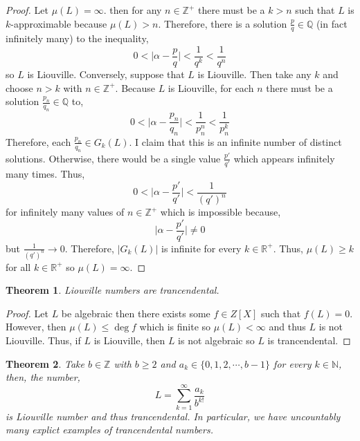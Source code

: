 \documentclass{article}
\newcommand{\Z}{\mathbb{Z}}
\newcommand{\N}{\mathbb{N}}
\newcommand{\Zplus}{\mathbb{Z}^{+}}
\newcommand{\Q}{\mathbb{Q}}
\newcommand{\Rplus}{\mathbb{R}^+}
\theoremstyle{theorem}
\newtheorem{theorem}{Theorem}[section]
\theoremstyle{definition}
\theoremstyle{definition}
\theoremstyle{remark}
\theoremstyle{definition}
\theoremstyle{remark}
\begin{document}
\begin{proof}
Let $\mu(L) = \infty$. then for any $n \in \Zplus$ there must be a $k > n$ such that $L$ is $k$-approximable because $\mu(L) > n$. Therefore, there is a solution $\frac{p}{q} \in \Q$ (in fact infinitely many) to the inequality,
\[0 < \Big| \alpha - \frac{p}{q} \Big| < \frac{1}{q^k} < \frac{1}{q^n}\] 
so $L$ is Liouville. Conversely, suppose that $L$ is Liouville. Then take any $k$ and choose $n > k$ with $n \in \Zplus$. Because $L$ is Liouville, for each $n$ there must be a solution $\frac{p_n}{q_n} \in \Q$ to,
\[0 < \Big| \alpha - \frac{p_n}{q_n} \Big| < \frac{1}{p_n^n} < \frac{1}{p_n^k}\]
Therefore, each $\frac{p_n}{q_n} \in G_k(L)$. I claim that this is an infinite number of distinct solutions. Otherwise, there would be a single value $\frac{p'}{q'}$ which appears infinitely many times. Thus,  
\[0 < \Big| \alpha - \frac{p'}{q'} \Big| < \frac{1}{(q')^n}\]
for infinitely many values of $n \in \Zplus$ which is impossible because,
\[\Big| \alpha - \frac{p'}{q'} \Big| \neq 0\]
but $\frac{1}{(q')^n} \to 0$. Therefore, $|G_k(L)|$ is infinite for every $k \in \Rplus$. Thus, $\mu(L) \ge k$ for all $k \in \Rplus$ so $\mu(L) = \infty$.
\end{proof}

\begin{theorem}
Liouville numbers are trancendental. 
\end{theorem}

\begin{proof}
Let $L$ be algebraic then there exists some $f \in Z[X]$ such that $f(L) = 0$. However, then $\mu(L) \le \deg{f}$ which is finite so $\mu(L) < \infty$ and thus $L$ is not Liouville. Thus, if $L$ is Liouville, then $L$ is not algebraic so $L$ is trancendental.
\end{proof}

\begin{theorem}
Take $b \in \Z$ with $b \ge 2$ and $a_k \in \{0, 1, 2, \cdots, b - 1\}$ for every $k \in \N$, then, the number,
\[L = \sum_{k = 1}^\infty \frac{a_k}{b^{k!}}\] is Liouville number and thus trancendental. In particular, we have uncountably many explict examples of trancendental numbers. 
\end{theorem}
\end{document}
